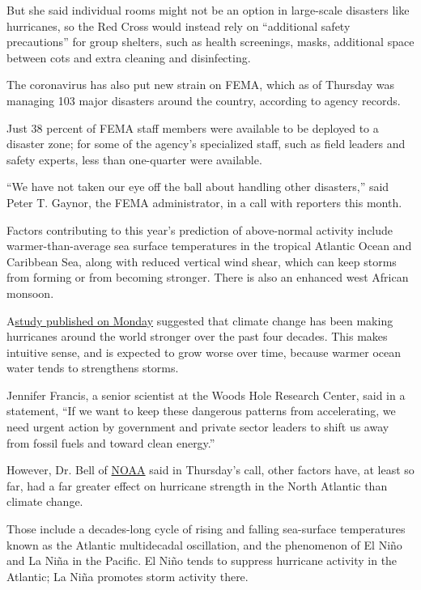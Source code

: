 But she said individual rooms might not be an option in large-scale
disasters like hurricanes, so the Red Cross would instead rely on
``additional safety precautions'' for group shelters, such as health
screenings, masks, additional space between cots and extra cleaning and
disinfecting.

The coronavirus has also put new strain on FEMA, which as of Thursday
was managing 103 major disasters around the country, according to agency
records.

Just 38 percent of FEMA staff members were available to be deployed to a
disaster zone; for some of the agency's specialized staff, such as field
leaders and safety experts, less than one-quarter were available.

``We have not taken our eye off the ball about handling other
disasters,'' said Peter T. Gaynor, the FEMA administrator, in a call
with reporters this month.

Factors contributing to this year's prediction of above-normal activity
include warmer-than-average sea surface temperatures in the tropical
Atlantic Ocean and Caribbean Sea, along with reduced vertical wind
shear, which can keep storms from forming or from becoming stronger.
There is also an enhanced west African monsoon.

A\href{https://www.nytimes.com/2020/05/18/climate/climate-changes-hurricane-intensity.html}{study
published on Monday} suggested that climate change has been making
hurricanes around the world stronger over the past four decades. This
makes intuitive sense, and is expected to grow worse over time, because
warmer ocean water tends to strengthens storms.

Jennifer Francis, a senior scientist at the Woods Hole Research Center,
said in a statement, ``If we want to keep these dangerous patterns from
accelerating, we need urgent action by government and private sector
leaders to shift us away from fossil fuels and toward clean energy.''

However, Dr. Bell of
\href{https://www.nytimes.com/2020/07/09/climate/trump-hurricane-dorian-noaa.html}{NOAA}
said in Thursday's call, other factors have, at least so far, had a far
greater effect on hurricane strength in the North Atlantic than climate
change.

Those include a decades-long cycle of rising and falling sea-surface
temperatures known as the Atlantic multidecadal oscillation, and the
phenomenon of El Niño and La Niña in the Pacific. El Niño tends to
suppress hurricane activity in the Atlantic; La Niña promotes storm
activity there.

